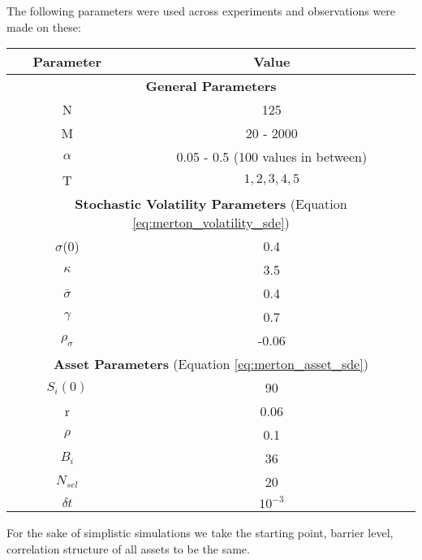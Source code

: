 The following parameters were used across experiments and observations were made
on these:
\begin{center}
	\begin{tabular}{|c|c|}
		\hline
		Parameter       & Value                              \\
		\hline
		\multicolumn{2}{|c|}{\textbf{General Parameters}}\\
		\hline
		N               & 125                                \\
		\hline
		M               & 20 - 2000                          \\
		\hline
		$\alpha $       & 0.05 - 0.5 (100 values in between) \\
		\hline
		T               & $1, 2, 3, 4, 5$                    \\
		\hline
		\multicolumn{2}{|c|}{\textbf{Stochastic Volatility Parameters} (Equation
		\ref{eq:merton_volatility_sde})}\\
		\hline
		$\sigma$(0)     & 0.4                                \\
		\hline
		$\kappa $       & 3.5                                \\
		\hline
		$\bar{\sigma}$  & 0.4                                \\
		\hline
		$\gamma$        & 0.7                                \\
		\hline
		$\rho_{\sigma}$ & -0.06                              \\
		\hline
		\multicolumn{2}{|c|}{\textbf{Asset Parameters} (Equation \ref{eq:merton_asset_sde})}\\
		\hline
		$S_i(0)$        & 90                                 \\
		\hline
		r               & 0.06                               \\
		\hline
		$\rho$          & 0.1                                \\
		\hline
		$B_i$           & 36                                 \\
		\hline
		$N_{sel}$       & 20                                 \\
		\hline
		$\delta t$      & $10^{-3}$                          \\
		\hline
	\end{tabular}
\end{center}

For the sake of simplistic simulations we take the starting point, barrier
level, correlation structure of all assets to be the same.

